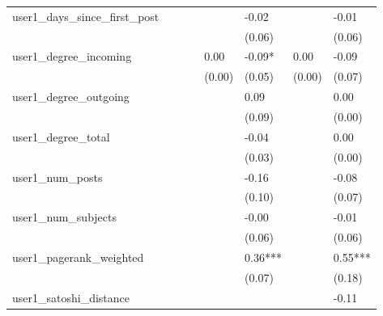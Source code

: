 \begin{table}
\begin{center}
\begin{tabular}{llllllll}
user1_days_since_first_post                      &          &            &         &         & -0.02        &                    & -0.01    \\
                                                 &          &            &         &         & (0.06)       &                    & (0.06)   \\
user1_degree_incoming                            &          &            &         & 0.00    & -0.09*       & 0.00               & -0.09    \\
                                                 &          &            &         & (0.00)  & (0.05)       & (0.00)             & (0.07)   \\
user1_degree_outgoing                            &          &            &         &         & 0.09         &                    & 0.00     \\
                                                 &          &            &         &         & (0.09)       &                    & (0.00)   \\
user1_degree_total                               &          &            &         &         & -0.04        &                    & 0.00     \\
                                                 &          &            &         &         & (0.03)       &                    & (0.00)   \\
user1_num_posts                                  &          &            &         &         & -0.16        &                    & -0.08    \\
                                                 &          &            &         &         & (0.10)       &                    & (0.07)   \\
user1_num_subjects                               &          &            &         &         & -0.00        &                    & -0.01    \\
                                                 &          &            &         &         & (0.06)       &                    & (0.06)   \\
user1_pagerank_weighted                          &          &            &         &         & 0.36***      &                    & 0.55***  \\
                                                 &          &            &         &         & (0.07)       &                    & (0.18)   \\
user1_satoshi_distance                           &          &            &         &         &              &                    & -0.11    \\

\end{tabular}
\end{center}
\end{table}
